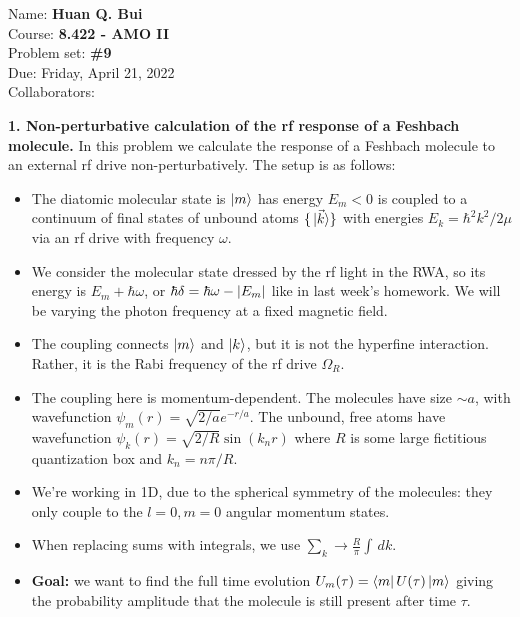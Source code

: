 \documentclass{article}
\theoremstyle{definition}
\newcommand{\f}[2]{\frac{#1}{#2}}
\begin{document}
\begin{framed}
\noindent Name: \textbf{Huan Q. Bui}\\
Course: \textbf{8.422 - AMO II}\\
Problem set: \textbf{\#9}\\
Due: Friday, April 21, 2022\\
Collaborators:  
\end{framed}
	

\noindent \textbf{1. Non-perturbative calculation of the rf response of a Feshbach molecule.} In this problem we calculate the response of a Feshbach molecule to an external rf drive non-perturbatively. The setup is as follows:
\begin{itemize}
 
 \item The diatomic molecular state is $\ket{m}$ has energy $E_m < 0$ is coupled to a continuum of final states of unbound atoms $\{ \ket*{\vec{k}}  \}$ with energies $E_k = \hbar^2 k^2 / 2\mu$ via an rf drive with frequency $\omega$. 
 
 \item We consider the molecular state dressed by the rf light in the RWA, so its energy is $E_m + \hbar \omega$, or $\hbar \delta = \hbar \omega - \abs{E_m}$ like in last week's homework.  We will be varying the photon frequency at a fixed magnetic field. 
 
 \item The coupling connects $\ket{m}$ and $\ket{k}$, but it is not the hyperfine interaction. Rather, it is the Rabi frequency of the rf drive $\Omega_R$. 
 
 \item The coupling here is momentum-dependent. The molecules have size $\sim a$, with wavefunction $\psi_m(r) = \sqrt{2/a} e^{-r/a}$. The unbound, free atoms have wavefunction $\psi_k(r) = \sqrt{2/R} \sin(k_n r)$ where $R$ is some large fictitious quantization box and $k_n = n\pi/R$. 
 
 \item We're working in 1D, due to the spherical symmetry of the molecules: they only couple to the $l=0,m=0$ angular momentum states. 
 
 \item When replacing sums with integrals, we use $\sum_k \to \f{R}{\pi} \int \, dk$. 
 
 \item \textbf{Goal:} we want to find the full time evolution $U_m(\tau) = \bra{m} U(\tau) \ket{m}$ giving the probability amplitude that the molecule is still present after time $\tau$.  
 

\end{itemize}
\end{document}

